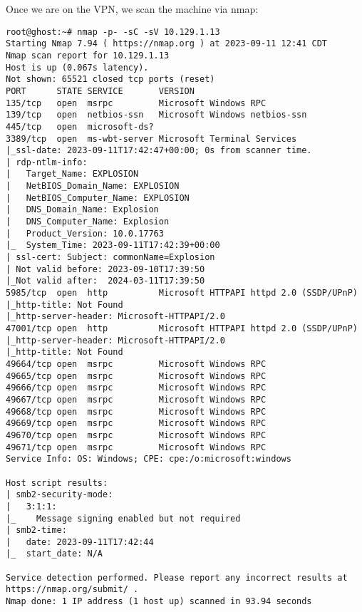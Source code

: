 \documentclass[conference]{IEEEtran}
\begin{document}
Once we are on the VPN, we scan the machine via nmap:
\begin{scriptsize}
\begin{verbatim}
root@ghost:~# nmap -p- -sC -sV 10.129.1.13
Starting Nmap 7.94 ( https://nmap.org ) at 2023-09-11 12:41 CDT
Nmap scan report for 10.129.1.13
Host is up (0.067s latency).
Not shown: 65521 closed tcp ports (reset)
PORT      STATE SERVICE       VERSION
135/tcp   open  msrpc         Microsoft Windows RPC
139/tcp   open  netbios-ssn   Microsoft Windows netbios-ssn
445/tcp   open  microsoft-ds?
3389/tcp  open  ms-wbt-server Microsoft Terminal Services
|_ssl-date: 2023-09-11T17:42:47+00:00; 0s from scanner time.
| rdp-ntlm-info:
|   Target_Name: EXPLOSION
|   NetBIOS_Domain_Name: EXPLOSION
|   NetBIOS_Computer_Name: EXPLOSION
|   DNS_Domain_Name: Explosion
|   DNS_Computer_Name: Explosion
|   Product_Version: 10.0.17763
|_  System_Time: 2023-09-11T17:42:39+00:00
| ssl-cert: Subject: commonName=Explosion
| Not valid before: 2023-09-10T17:39:50
|_Not valid after:  2024-03-11T17:39:50
5985/tcp  open  http          Microsoft HTTPAPI httpd 2.0 (SSDP/UPnP)
|_http-title: Not Found
|_http-server-header: Microsoft-HTTPAPI/2.0
47001/tcp open  http          Microsoft HTTPAPI httpd 2.0 (SSDP/UPnP)
|_http-server-header: Microsoft-HTTPAPI/2.0
|_http-title: Not Found
49664/tcp open  msrpc         Microsoft Windows RPC
49665/tcp open  msrpc         Microsoft Windows RPC
49666/tcp open  msrpc         Microsoft Windows RPC
49667/tcp open  msrpc         Microsoft Windows RPC
49668/tcp open  msrpc         Microsoft Windows RPC
49669/tcp open  msrpc         Microsoft Windows RPC
49670/tcp open  msrpc         Microsoft Windows RPC
49671/tcp open  msrpc         Microsoft Windows RPC
Service Info: OS: Windows; CPE: cpe:/o:microsoft:windows

Host script results:
| smb2-security-mode:
|   3:1:1:
|_    Message signing enabled but not required
| smb2-time:
|   date: 2023-09-11T17:42:44
|_  start_date: N/A

Service detection performed. Please report any incorrect results at https://nmap.org/submit/ .
Nmap done: 1 IP address (1 host up) scanned in 93.94 seconds
\end{verbatim}
\end{scriptsize}
\end{document}
